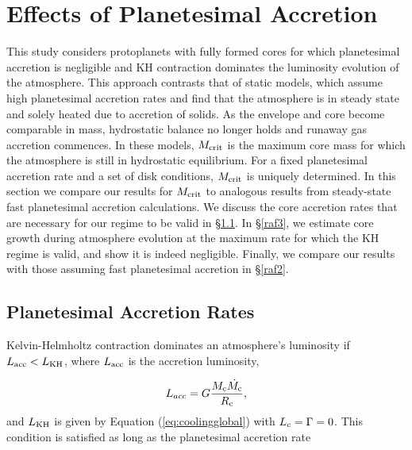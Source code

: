 \documentclass[apj]{emulateapj}
\newcommand{\co}{_{\rm c}}
\begin{document}
\section{Effects of Planetesimal Accretion}
\label{acc}

This study considers protoplanets with fully formed cores for which planetesimal accretion is negligible and KH contraction dominates the luminosity evolution of the atmosphere. This approach contrasts that of static models, which assume high planetesimal accretion rates and find that the atmosphere is in steady state and solely heated due to accretion of solids. As the envelope and core become comparable in mass, hydrostatic balance no longer holds and runaway gas accretion commences. In these models, $M_{\rm crit}$ is the maximum core mass for which the atmosphere is still in hydrostatic equilibrium. For a fixed planetesimal accretion rate and a set of disk conditions, $M_{\rm crit}$ is uniquely determined. In this section we compare our results for $M_{\rm crit}$ to analogous results from steady-state fast planetesimal accretion calculations. We discuss the core accretion rates that are necessary for our regime to be valid in \S\ref{raf1}. In \S\ref{raf3}, we estimate core growth during atmosphere evolution at the maximum rate for which the KH regime is valid, and show it is indeed negligible. Finally, we compare our results with those assuming fast planetesimal accretion in \S\ref{raf2}.


\subsection{Planetesimal Accretion Rates}
\label{raf1}

Kelvin-Helmholtz contraction dominates an atmosphere's luminosity if  $L_{\mathrm{acc}} < L_{\rm{KH}}$, where $L_{\rm{acc}}$ is the accretion luminosity,

\begin{equation}
\label{eq:Lacc}
L_{acc}=G \frac{M_{\rm{c}} \dot{M_{\rm{c}}}}{R_{\rm{c}}},
\end{equation}
and $L_{\rm KH}$ is given by Equation (\ref{eq:coolingglobal}) with $L\co=\Gamma=0$. This condition is satisfied as long as the planetesimal accretion rate 
\end{document}
